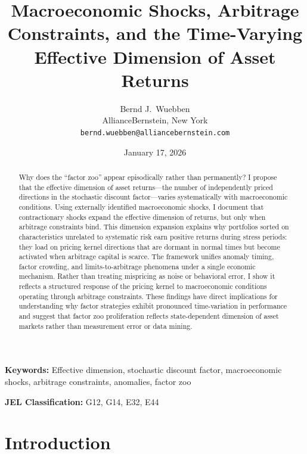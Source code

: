 \documentclass[12pt,letterpaper]{article}
\title{Macroeconomic Shocks, Arbitrage Constraints, and the
Time-Varying Effective Dimension of Asset Returns}
\author{
    Bernd J.\ Wuebben\\
    AllianceBernstein, New York\\ \texttt{bernd.wuebben@alliancebernstein.com}
}
\date{January 17, 2026}
\theoremstyle{plain}
\theoremstyle{definition}
\begin{document}
\maketitle



\begin{abstract}
\noindent
Why does the ``factor zoo'' appear episodically rather than permanently? I propose that the effective dimension of asset returns---the number of independently priced directions in the stochastic discount factor---varies systematically with macroeconomic conditions. Using externally identified macroeconomic shocks, I document that contractionary shocks expand the effective dimension of returns, but only when arbitrage constraints bind. This dimension expansion explains why portfolios sorted on characteristics unrelated to systematic risk earn positive returns during stress periods: they load on pricing kernel directions that are dormant in normal times but become activated when arbitrage capital is scarce. The framework unifies anomaly timing, factor crowding, and limits-to-arbitrage phenomena under a single economic mechanism. Rather than treating mispricing as noise or behavioral error, I show it reflects a structured response of the pricing kernel to macroeconomic conditions operating through arbitrage constraints. These findings have direct implications for understanding why factor strategies exhibit pronounced time-variation in performance and suggest that factor zoo proliferation reflects state-dependent dimension of asset markets rather than measurement error or data mining.
\end{abstract}

\vspace{0.5cm}

\noindent\textbf{Keywords:} Effective dimension, stochastic discount factor, macroeconomic shocks, arbitrage constraints, anomalies, factor zoo

\vspace{0.3cm}

\noindent\textbf{JEL Classification:} G12, G14, E32, E44


\doublespacing

\section{Introduction}\label{sec:intro}
\end{document}
